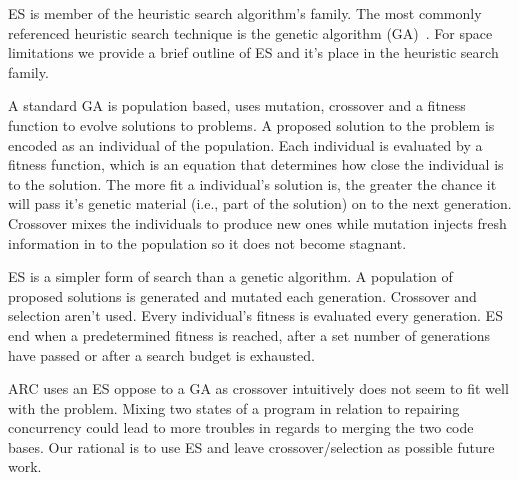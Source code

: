 ES is member of the heuristic search algorithm's family. The most commonly
referenced heuristic search technique is the genetic algorithm
(GA)~\cite{GA92}. For space limitations we provide a brief outline of ES and
it's place in the heuristic search family.

A standard GA is population based, uses mutation, crossover and a fitness
function to evolve solutions to problems. A proposed solution to the problem is
encoded as an individual of the population. Each individual is evaluated by a
fitness function, which is an equation that determines how close the individual
is to the solution. The more fit a individual's solution is, the greater the
chance it will pass it's genetic material (i.e., part of the solution) on to
the next generation.
Crossover mixes the individuals to produce new ones while mutation injects
fresh information in to the population so it does not become stagnant.

ES is a simpler form of search than a genetic algorithm. A population of
proposed solutions is generated and mutated each generation. Crossover and
selection aren't used. Every individual's fitness is evaluated every
generation. ES end when a predetermined fitness is reached, after a set number
of generations have passed or after a search budget is exhausted.

ARC uses an ES oppose to a GA as crossover intuitively does not seem to fit
well with the problem. Mixing two states of a program in relation to repairing
concurrency could lead to more troubles in regards to merging the two code
bases. Our rational is to use ES and leave crossover/selection as possible
future work.
